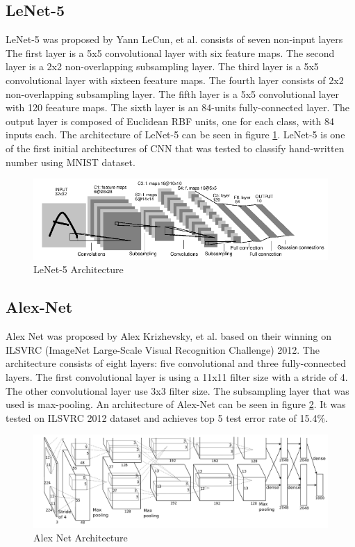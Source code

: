\subsection{LeNet-5}
LeNet-5 was proposed by Yann LeCun, et al. \cite{lecun1998gradient} consists of seven non-input layers 
The first layer is a 5x5 convolutional layer with six feature maps. The second layer is a 2x2 non-overlapping subsampling layer. The third layer is a 5x5 convolutional layer with sixteen feeature maps. The fourth layer consists of 2x2 non-overlapping subsampling layer. The fifth layer is a 5x5 convolutional layer with 120 feeature maps. The sixth layer is an 84-units fully-connected layer. The output layer is composed of Euclidean RBF units, one for each class, with 84 inputs each. The architecture of LeNet-5 can be seen in figure \ref{fig:lenet5}. LeNet-5 is one of the first initial architectures of CNN that was tested to classify hand-written number using MNIST dataset.


\begin{figure}[h]
	\includegraphics[scale=0.5]{figures/lenet5}
	\centering
	\caption{LeNet-5 Architecture \cite{lecun1998gradient}}
	\label{fig:lenet5}
\end{figure}


\subsection{Alex-Net}
Alex Net was proposed by Alex Krizhevsky, et al. \cite{krizhevsky2012imagenet} based on their winning on ILSVRC (ImageNet Large-Scale Visual Recognition Challenge) 2012. The architecture consists of eight layers: five convolutional and three fully-connected layers. The first convolutional layer is using a 11x11 filter size with a stride of 4. The other convolutional layer use 3x3 filter size. The subsampling layer that was used is max-pooling. An architecture of Alex-Net can be seen in figure \ref{fig:alexnet}. It was tested on ILSVRC 2012 dataset and achieves top 5 test error rate of 15.4\%.
\begin{figure}[h]
	\includegraphics[scale=0.25]{figures/alexnet}
	\centering
	\caption{Alex Net Architecture \cite{krizhevsky2012imagenet}}
	\label{fig:alexnet}
\end{figure}
